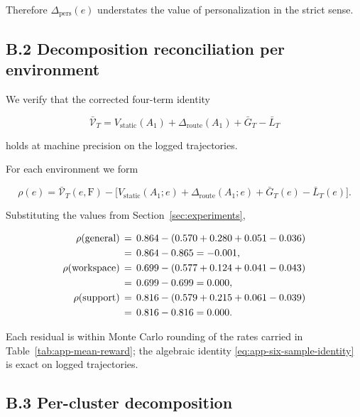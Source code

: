 \documentclass{article} %
\begin{document}
Therefore $\Delta_{\mathrm{pers}}(e)$ understates the value of personalization in the strict sense.

\subsection{B.2 Decomposition reconciliation per environment}

\label{app:decomp-reconcile}

We verify that the corrected four-term identity

\begin{equation}
\label{eq:app-identity-recall}
\bar{\mathcal{V}}_T = V_{\mathrm{static}}(A_1) + \Delta_{\mathrm{route}}(A_1) + \bar{G}_T - \bar{L}_T
\end{equation}

holds at machine precision on the logged trajectories.

For each environment we form

\begin{equation}
\label{eq:app-residual}
\rho(e) = \bar{\mathcal{V}}_T(e,\mathrm{F}) - \big[V_{\mathrm{static}}(A_1;e) + \Delta_{\mathrm{route}}(A_1;e) + \bar{G}_T(e) - \bar{L}_T(e)\big].
\end{equation}

Substituting the values from Section~\ref{sec:experiments},

\begin{align}
\label{eq:app-residual-num}
\rho(\mathrm{general})  &\,=\, 0.864 - (0.570 + 0.280 + 0.051 - 0.036)\notag\\
                        &\,=\, 0.864 - 0.865 = -0.001,\\
\rho(\mathrm{workspace})&\,=\, 0.699 - (0.577 + 0.124 + 0.041 - 0.043)\notag\\
                        &\,=\, 0.699 - 0.699 = 0.000,\\
\rho(\mathrm{support})  &\,=\, 0.816 - (0.579 + 0.215 + 0.061 - 0.039)\notag\\
                        &\,=\, 0.816 - 0.816 = 0.000.
\end{align}

Each residual is within Monte Carlo rounding of the rates carried in Table~\ref{tab:app-mean-reward}; the algebraic identity \eqref{eq:app-six-sample-identity} is exact on logged trajectories.

\subsection{B.3 Per-cluster decomposition}
\end{document}
